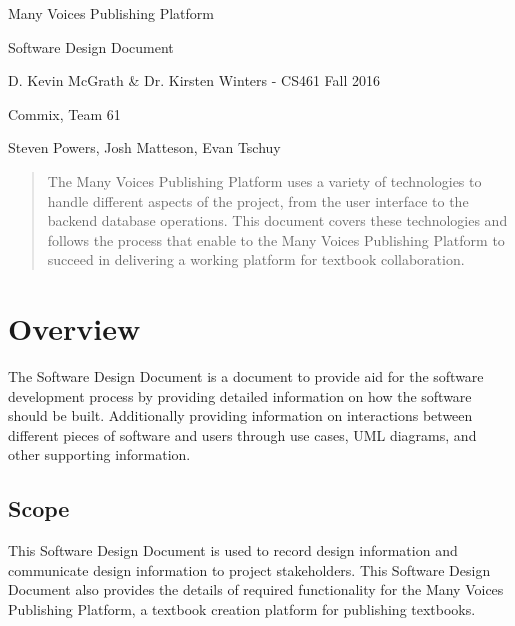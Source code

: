 \documentclass[letterpaper, 10pt, draftclsnofoot, compsoc, onecolumn]{IEEEtran}
\begin{document}
\begin{titlepage}
\centering
{\huge Many Voices Publishing Platform\par}
{\LARGE Software Design Document\par}
{\vspace{5mm}}
{\large D. Kevin McGrath \& Dr. Kirsten Winters -  CS461 Fall 2016\par}
{\large Commix, Team 61\par}
{\large Steven Powers, Josh Matteson, Evan Tschuy\par}
{\vspace{10mm}}

\begin{abstract}
\noindent The Many Voices Publishing Platform uses a variety of technologies
to handle different aspects of the project, from the user interface to the
backend database operations. This document covers these technologies and follows the process
that enable to the Many Voices Publishing Platform to succeed in delivering
a working platform for textbook collaboration.
\end{abstract}

\end{titlepage}

\tableofcontents

\newpage

\setcounter{page}{1}\pagestyle{fancy}





\vspace{1pc}
\section{Overview}
{\noindent The Software Design Document is a document to provide aid
for the software development process by providing detailed information
on how the software should be built. Additionally providing information
on interactions between different pieces of software and users through
use cases, UML diagrams, and other supporting information. \par}

\subsection{Scope}
{\noindent This Software Design Document is used to record design
information and communicate design information to project stakeholders.
This Software Design Document also provides the details of required
functionality for the Many Voices Publishing Platform, a textbook creation
platform for publishing textbooks.
\par}
\end{document}
